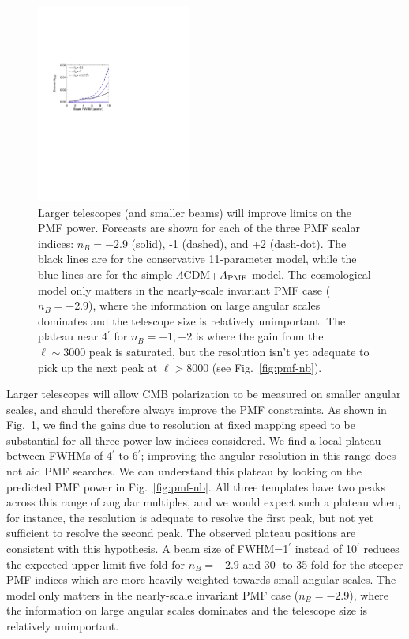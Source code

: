 \documentclass[apj]{emulateapj}
\newcommand{\apmf}{\ensuremath{A_{\rm PMF}}}
\newcommand{\lcdm}{\ensuremath{\Lambda}CDM}
\begin{document}
\begin{figure}[htb]\centering
\includegraphics[width=0.45\textwidth,clip,trim={1.5cm 12.5cm 11cm 7.5cm}]{pmf_beam.pdf}
  \caption[]{ \label{fig:beam}
 Larger telescopes (and smaller beams) will improve limits on the PMF power. 
 Forecasts are shown for each of the three PMF scalar indices: $n_B = -2.9$ (solid), -1 (dashed), and +2 (dash-dot). 
  The black lines are for the conservative 11-parameter model, while the blue lines are for the simple \lcdm{}+\apmf{} model. 
  The cosmological model only matters in the nearly-scale invariant PMF case ($n_B=-2.9$), where the information on large angular scales dominates and the telescope size is relatively unimportant. 
  The plateau near 4$^\prime$ for $n_B=-1, +2$ is where the gain from the $\ell\sim3000$ peak is saturated, but the resolution isn't yet adequate to pick up the next peak at $\ell > 8000$ (see  Fig.~\ref{fig:pmf-nb}).  
    }
\end{figure}

Larger telescopes will allow CMB polarization to be measured on smaller angular scales, and should therefore always improve the PMF constraints. 
As shown in Fig.~\ref{fig:beam}, we find the gains due to resolution at fixed mapping speed to be substantial for all three power law indices considered. 
We find a local plateau between FWHMs of 4$^\prime$ to 6$^\prime$; improving the angular resolution in this range does not aid PMF searches. 
We can understand this plateau by looking on the predicted PMF power in Fig.~\ref{fig:pmf-nb}. 
All three templates have two peaks across this range of angular multiples, and we would expect such a plateau when, for instance, the resolution is adequate to resolve the first peak, but not yet sufficient to resolve the second peak. 
The observed plateau positions are consistent with this hypothesis. 
 A beam size of FWHM=1$^\prime$ instead of 10$^\prime$ reduces the expected upper limit five-fold for $n_B=-2.9$ and 30- to 35-fold for the steeper PMF indices which are more heavily weighted towards small angular scales. 
   The model only matters in the nearly-scale invariant PMF case ($n_B=-2.9$), where the information on large angular scales dominates and the telescope size is relatively unimportant. 
\end{document}
